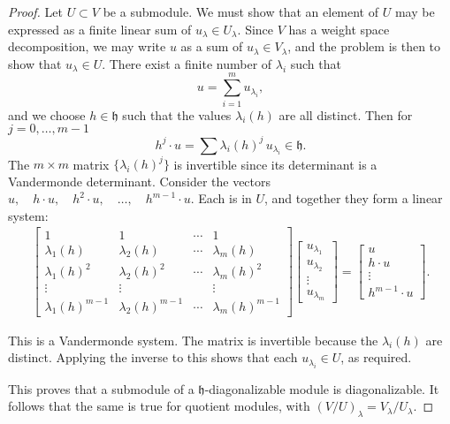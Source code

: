 \documentclass[12pt]{article}
\begin{document}
\begin{proof}
    Let $U \subset V$ be a submodule. We must show that an element of $U$ may be expressed as a finite linear sum of $u_\lambda \in U_\lambda$. Since $V$ has a weight space decomposition, we may write $u$ as a sum of $u_\lambda \in V_\lambda$, and the problem is then to show that $u_\lambda \in U$. There exist a finite number of $\lambda_i$ such that
    \[
        u = \sum_{i=1}^m u_{\lambda_i},
    \]
    and we choose $h \in \mathfrak{h}$ such that the values $\lambda_i(h)$ are all distinct. Then for $j=0,\dots,m-1$
    \[
        h^j \cdot u = \sum \lambda_i(h)^j \, u_{\lambda_i} \in \mathfrak{h}.
    \]
    The $m \times m$ matrix $\{ \lambda_i(h)^j \}$ is invertible since its determinant is a Vandermonde determinant. Consider the vectors
    $u, \quad h \cdot u, \quad h^2 \cdot u, \quad \dots, \quad h^{m-1}\cdot u.$ Each is in $U$, and together they form a linear system:
    \begin{align*}
        \begin{bmatrix}
            1                  & 1                  & \cdots & 1                  \\
            \lambda_1(h)       & \lambda_2(h)       & \cdots & \lambda_m(h)       \\
            \lambda_1(h)^2     & \lambda_2(h)^2     & \cdots & \lambda_m(h)^2     \\
            \vdots             & \vdots             &        & \vdots             \\
            \lambda_1(h)^{m-1} & \lambda_2(h)^{m-1} & \cdots & \lambda_m(h)^{m-1}
        \end{bmatrix}
        \begin{bmatrix}
            u_{\lambda_1} \\ u_{\lambda_2} \\ \vdots \\ u_{\lambda_m}
        \end{bmatrix} = \begin{bmatrix}
                            u \\ h\cdot u \\ \vdots \\ h^{m-1}\cdot u
                        \end{bmatrix}.
    \end{align*}

    This is a Vandermonde system. The matrix is invertible because the $\lambda_i(h)$ are distinct. Applying the inverse to this shows that each $u_{\lambda_i} \in U$, as required.

    This proves that a submodule of a $\mathfrak{h}$-diagonalizable module is diagonalizable. It follows that the same is true for quotient modules, with $(V/U)_\lambda = V_\lambda / U_\lambda$.
\end{proof}
\end{document}
